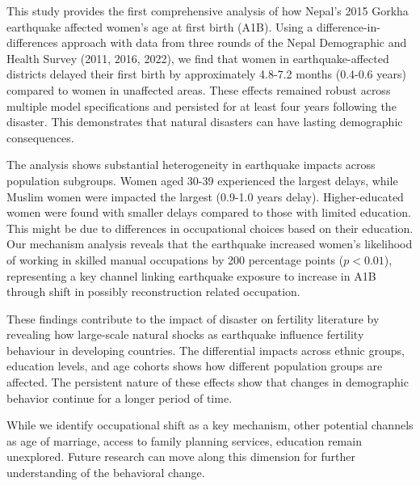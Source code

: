 \documentclass[11pt,a4paper]{article}
\begin{document}
This study provides the first comprehensive analysis of how Nepal's 2015 Gorkha earthquake affected women's age at first birth (A1B). Using a difference-in-differences approach with data from three rounds of the Nepal Demographic and Health Survey (2011, 2016, 2022), we find that women in earthquake-affected districts delayed their first birth by approximately 4.8-7.2 months (0.4-0.6 years) compared to women in unaffected areas. These effects remained robust across multiple model specifications and persisted for at least four years following the disaster. This demonstrates that natural disasters can have lasting demographic consequences.

\vspace{0.25 cm}

The analysis shows substantial heterogeneity in earthquake impacts across population subgroups. Women aged 30-39 experienced the largest delays, while Muslim women were impacted the largest (0.9-1.0 years delay). Higher-educated women were found with smaller delays compared to those with limited education. This might be due to differences in occupational choices based on their education. Our mechanism analysis reveals that the earthquake increased women's likelihood of working in skilled manual occupations by 200 percentage points ($p < 0.01$), representing a key channel linking earthquake exposure to increase in A1B through shift in possibly reconstruction related occupation.

\vspace{0.25 cm}

These findings contribute to the impact of disaster on fertility literature by revealing how large-scale natural shocks as earthquake influence fertility behaviour in developing countries. The differential impacts across ethnic groups, education levels, and age cohorts shows how different population groups are affected. The persistent nature of these effects show that changes in demographic behavior continue for a longer period of time.

\vspace{0.25cm}
While we identify occupational shift as a key mechanism, other potential channels as age of marriage, access to family planning services, education remain unexplored. Future research can move along this dimension for further understanding of the behavioral change.


\newpage



\newpage
\appendix
\end{document}
